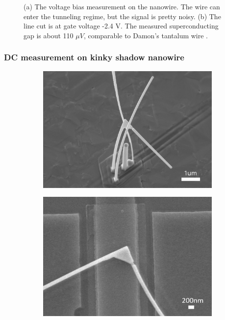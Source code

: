 \begin{figure}[h!]
\begin{subfigure}[b]{0.75\textwidth}
            \caption{}
            \label{fig:my_label}
     \end{subfigure}
    \caption{(a) The voltage bias measurement on the nanowire. The wire can enter the tunneling regime, but the signal is pretty noisy. (b) The line cut is at gate voltage -2.4 V. The measured superconducting gap is about 110 $\mu V$, comparable to Damon's tantalum wire \cite{RN37}.}
    \label{D3Vbias}
    \end{figure}
    
\clearpage
\subsubsection{DC measurement on kinky shadow nanowire}

\begin{figure}[h!]
    \centering
    \begin{subfigure}[b]{0.48\textwidth}
         \centering
         \includegraphics[width=\textwidth]{Pic/Kinkywire_SEM.jpg}
         \caption{}
         \label{}
     \end{subfigure}
     \hfill
     \begin{subfigure}[b]{0.47\textwidth}
         \centering
         \includegraphics[width=\textwidth]{Pic/Kinkywire_SEM_0.jpg}

\end{subfigure}
\end{figure}
